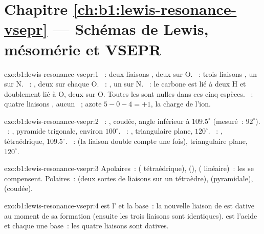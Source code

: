 \section*{Chapitre \ref{ch:b1:lewis-resonance-vsepr} --- Schémas de Lewis, mésomérie et VSEPR}

\begin{solution}{exo:b1:lewis-resonance-vsepr:1}
~: deux liaisons , deux  sur O.
~: trois liaisons , un  sur N.
~: , deux  sur chaque O.
~: , un  sur N. ~: le carbone
est lié à deux H et doublement lié à O, deux  sur O.
Toutes les  sont nulles dans ces cinq espèces.
~: quatre liaisons , aucun ~; azote
$5 - 0 - 4 = +1$, la charge de l'ion.
\end{solution}

\begin{solution}{exo:b1:lewis-resonance-vsepr:2}
~: , coudée, angle inférieur à $109.5^\circ$ (mesuré~:
$92^\circ$). ~: , pyramide trigonale, environ
$100^\circ$. ~: , triangulaire plane, $120^\circ$.
~: , tétraédrique, $109.5^\circ$. ~:
 (la liaison double compte une fois), triangulaire plane,
$120^\circ$.
\end{solution}

\begin{solution}{exo:b1:lewis-resonance-vsepr:3}
Apolaires~:  ( tétraédrique),  (),
 ( linéaire)~: les  se compensent.
Polaires~:  (deux sortes de liaisons sur un tétraèdre),
 (pyramidale),  (coudée).
\end{solution}

\begin{solution}{exo:b1:lewis-resonance-vsepr:4}
 est l' et  la base~: la nouvelle liaison
 de  est dative au moment de sa formation (ensuite les
trois liaisons  sont identiques).  est l'acide et
chaque  une base~: les quatre liaisons  sont datives.
\end{solution}


